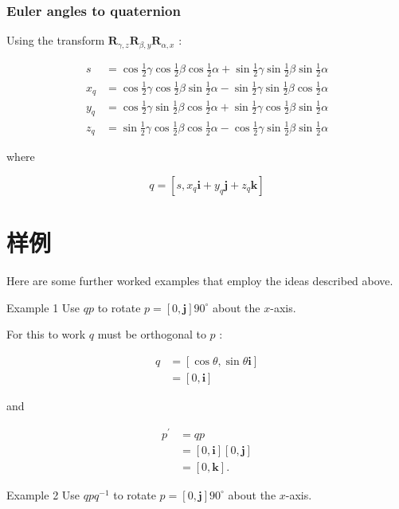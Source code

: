 \subsubsection*{Euler angles to quaternion}
Using the transform $\mathbf{R}_{\gamma, z} \mathbf{R}_{\beta, y} \mathbf{R}_{\alpha, x}$ :

$$
\begin{aligned}
s & =\cos \frac{1}{2} \gamma \cos \frac{1}{2} \beta \cos \frac{1}{2} \alpha+\sin \frac{1}{2} \gamma \sin \frac{1}{2} \beta \sin \frac{1}{2} \alpha \\
x_{q} & =\cos \frac{1}{2} \gamma \cos \frac{1}{2} \beta \sin \frac{1}{2} \alpha-\sin \frac{1}{2} \gamma \sin \frac{1}{2} \beta \cos \frac{1}{2} \alpha \\
y_{q} & =\cos \frac{1}{2} \gamma \sin \frac{1}{2} \beta \cos \frac{1}{2} \alpha+\sin \frac{1}{2} \gamma \cos \frac{1}{2} \beta \sin \frac{1}{2} \alpha \\
z_{q} & =\sin \frac{1}{2} \gamma \cos \frac{1}{2} \beta \cos \frac{1}{2} \alpha-\cos \frac{1}{2} \gamma \sin \frac{1}{2} \beta \sin \frac{1}{2} \alpha
\end{aligned}
$$

where

$$
q=\left[s, x_{q} \mathbf{i}+y_{q} \mathbf{j}+z_{q} \mathbf{k}\right]
$$

\section{样例}
Here are some further worked examples that employ the ideas described above.

Example 1 Use $q p$ to rotate $p=[0, \mathbf{j}] 90^{\circ}$ about the $x$-axis.

For this to work $q$ must be orthogonal to $p$ :

$$
\begin{aligned}
q & =[\cos \theta, \sin \theta \mathbf{i}] \\
& =[0, \mathbf{i}]
\end{aligned}
$$

and

$$
\begin{aligned}
p^{\prime} & =q p \\
& =[0, \mathbf{i}][0, \mathbf{j}] \\
& =[0, \mathbf{k}] .
\end{aligned}
$$

Example 2 Use $q p q^{-1}$ to rotate $p=[0, \mathbf{j}] 90^{\circ}$ about the $x$-axis.

